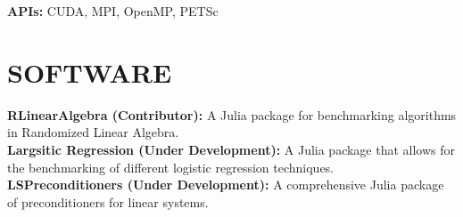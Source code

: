 \documentclass[margin,11pt]{res}
\begin{document}
\begin{resume}
\textbf{APIs:} CUDA, MPI, OpenMP, PETSc
\section{SOFTWARE}
\textbf{RLinearAlgebra (Contributor):} A Julia package for benchmarking algorithms in Randomized Linear Algebra.\\
\textbf{Largsitic Regression (Under Development):} A Julia package that allows for the benchmarking of different logistic regression techniques.\\
\textbf{LSPreconditioners (Under Development):} A comprehensive Julia package of preconditioners for linear systems.

\end{resume} 
\end{document}
